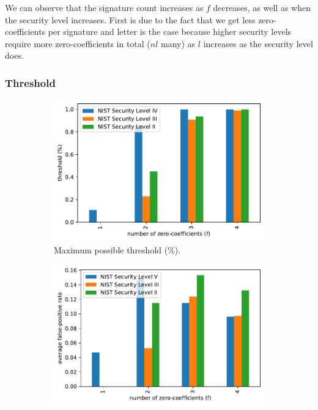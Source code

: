 We can observe that the signature count increases as $f$ decreases, as well as when the security level increases. First is due to the fact that we get less zero-coefficients per signature and letter is the case because higher security levels require more zero-coefficients in total ($nl$ many) as $l$ increases as the security level does.



\subsubsection{Threshold}
\label{sec:evalthreshold}

\begin{figure}%
	\centering%
	\begin{subfigure}{.5\textwidth}%
		\centering%
		\includegraphics[width=.95\linewidth]{plots/dilithium_threshold_percent}%
		\caption{Maximum possible threshold ($\%$).}%
		\label{fig:dilithiumthreshold}%
	\end{subfigure}%
	\begin{subfigure}{.5\textwidth}%
		\centering%
		\includegraphics[width=.95\linewidth]{plots/dilithium_threshold_fpr}%

\end{subfigure}
\end{figure}
